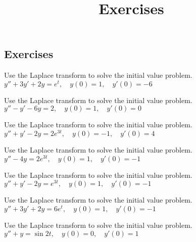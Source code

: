 \documentclass{ximera}
\title{Exercises} \license{CC BY-NC-SA 4.0}
\begin{document}
\begin{abstract}
\end{abstract}
\maketitle

\begin{onlineOnly}
\section*{Exercises}
\end{onlineOnly}



\begin{problem}\label{exer:8.3.1} Use the Laplace transform to solve the initial value problem. $y''+3y'+2y=e^t, \quad  y(0)=1,\quad y'(0)=-6$
\end{problem}

\begin{problem}\label{exer:8.3.2} Use the Laplace transform to solve the initial value problem. $y''-y'-6y=2, \quad  y(0)=1,\quad y'(0)=0$
\end{problem}

\begin{problem}\label{exer:8.3.3} Use the Laplace transform to solve the initial value problem. $y''+y'-2y=2e^{3t}, \quad  y(0)=-1,\quad y'(0)=4$
\end{problem}

\begin{problem}\label{exer:8.3.4} Use the Laplace transform to solve the initial value problem. $y''-4y=2 e^{3t}, \quad  y(0)=1,\quad y'(0)=-1$
\end{problem}

\begin{problem}\label{exer:8.3.5} Use the Laplace transform to solve the initial value problem. $y''+y'-2y=e^{3t}, \quad  y(0)=1,\quad y'(0)=-1$
\end{problem}

\begin{problem}\label{exer:8.3.6} Use the Laplace transform to solve the initial value problem. $y''+3y'+2y=6e^t, \quad  y(0)=1,\quad y'(0)=-1$
\end{problem}

\begin{problem}\label{exer:8.3.7} Use the Laplace transform to solve the initial value problem. $y''+y=\sin2t, \quad  y(0)=0,\quad y'(0)=1$
\end{problem}
\end{document}
